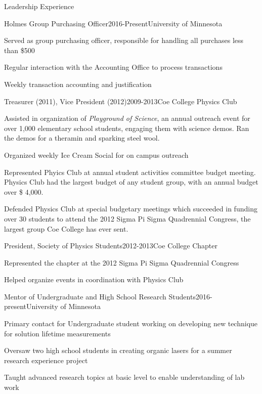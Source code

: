 \documentclass{resume} %
\begin{document}

\begin{rSection}{Leadership Experience}

\begin{rSubsection}{Holmes Group Purchasing Officer}{2016-Present}{University of Minnesota}{}
\item Served as group purchasing officer, responsible for handling all purchases less than \$500
\item Regular interaction with the Accounting Office to process transactions
\item Weekly transaction accounting and justification
\end{rSubsection}


\begin{rSubsection}{Treasurer (2011), Vice President (2012)}{2009-2013}{Coe College Physics Club}{}
\item Assisted in organization of {\em Playground of Science}, an annual outreach event for over 1,000 elementary school students, engaging them with science demos.  Ran the demos for a theramin and sparking steel wool.
\item Organized weekly Ice Cream Social for on campus outreach
\item Represented Phyics Club at annual student activities committee budget meeting.  Physics Club had the largest budget of any student group, with an annual budget over \$ 4,000.
\item Defended Physics Club at special budgetary meetings which succeeded in funding over 30 students to attend the 2012 Sigma Pi Sigma Quadrennial Congress, the largest group Coe College has ever sent.
\end{rSubsection}

\begin{rSubsection}{President, Society of Physics Students}{2012-2013}{Coe College Chapter}{}
\item Represented the chapter at the 2012 Sigma Pi Sigma Quadrennial Congress
\item Helped organize events in coordination with Physics Club
\end{rSubsection}


\begin{rSubsection}{Mentor of Undergraduate and High School Research Students}{2016-present}{University of Minnesota}{}
\item Primary contact for Undergraduate student working on developing new technique for solution lifetime measurements
\item Oversaw two high school students in creating organic lasers for a summer research experience project
\item Taught advanced research topics at basic level to enable understanding of lab work
\end{rSubsection}


\end{rSection}
\end{document}

